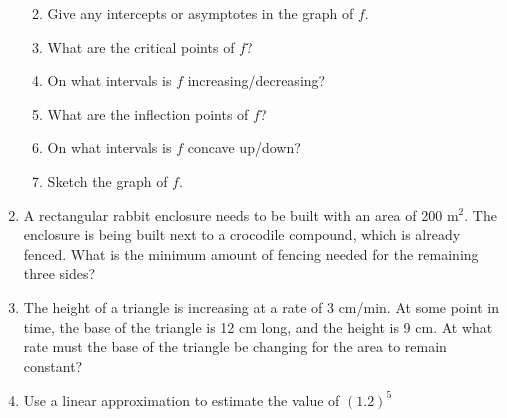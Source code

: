 \documentclass[12pt]{article}
\newcommand{\points}[1]{\marginpar{\hspace{24pt}[#1]}}
\begin{document}
\begin{enumerate}
\begin{enumerate}
  \vspace{1cm}
  
  \item Give any intercepts or asymptotes in the graph of $f$. \points{1}
  
  \vspace{1cm}
  
  \item What are the critical points of $f$?  \points{1}
  
  \vspace{1.5cm}
  
  \item On what intervals is $f$ increasing/decreasing? \points{1}
  
  \vspace{2cm}
  
  \item What are the inflection points of $f$?  \points{1}
  
  \vspace{1.5cm}
  
  \item On what intervals is $f$ concave up/down? \points{1}
  
  \vspace{2cm}

   \item Sketch the graph of $f$. \points{4}
 
  \end{enumerate}
\newpage
 
  \item  A rectangular rabbit enclosure needs to be built with an area of 200 $\text{m}^2$. The enclosure is being built next to a crocodile compound, which is already fenced. \points{5} What is the minimum amount of fencing needed for the remaining three sides?
  
  \vspace{4in}
  
  \item The height of a triangle is increasing at a rate of 3 cm/min. At some point in time, the base of the \points{5} triangle is 12 cm long, and the height is 9 cm. At what rate must the base of the triangle be changing for the area to remain constant? 
  
  
  
  
  
  \newpage
  
  \item Use a linear approximation to estimate the value of $(1.2)^5$ \points{3}
  

\end{enumerate}
\end{document}
